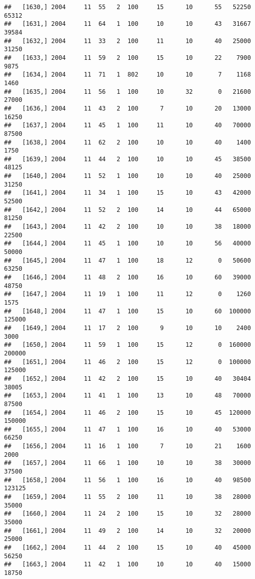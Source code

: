 \documentclass{article}\usepackage[]{graphicx}\usepackage[]{color}
\makeatletter
\newenvironment{kframe}{%
 \def\at@end@of@kframe{}%
 \ifinner\ifhmode%
  \def\at@end@of@kframe{\end{minipage}}%
  \begin{minipage}{\columnwidth}%
 \fi\fi%
 \def\FrameCommand##1{\hskip\@totalleftmargin \hskip-\fboxsep
 \colorbox{shadecolor}{##1}\hskip-\fboxsep
     \hskip-\linewidth \hskip-\@totalleftmargin \hskip\columnwidth}%
 \MakeFramed {\advance\hsize-\width
   \@totalleftmargin\z@ \linewidth\hsize
   \@setminipage}}%
 {\par\unskip\endMakeFramed%
 \at@end@of@kframe}
\newenvironment{knitrout}{}{} %
\makeatother
\begin{document}
\begin{knitrout}
\begin{kframe}
\begin{verbatim}
##   [1630,] 2004     11  55   2  100     15      10      55   52250   65312
##   [1631,] 2004     11  64   1  100     10      10      43   31667   39584
##   [1632,] 2004     11  33   2  100     11      10      40   25000   31250
##   [1633,] 2004     11  59   2  100     15      10      22    7900    9875
##   [1634,] 2004     11  71   1  802     10      10       7    1168    1460
##   [1635,] 2004     11  56   1  100     10      32       0   21600   27000
##   [1636,] 2004     11  43   2  100      7      10      20   13000   16250
##   [1637,] 2004     11  45   1  100     11      10      40   70000   87500
##   [1638,] 2004     11  62   2  100     10      10      40    1400    1750
##   [1639,] 2004     11  44   2  100     10      10      45   38500   48125
##   [1640,] 2004     11  52   1  100     10      10      40   25000   31250
##   [1641,] 2004     11  34   1  100     15      10      43   42000   52500
##   [1642,] 2004     11  52   2  100     14      10      44   65000   81250
##   [1643,] 2004     11  42   2  100     10      10      38   18000   22500
##   [1644,] 2004     11  45   1  100     10      10      56   40000   50000
##   [1645,] 2004     11  47   1  100     18      12       0   50600   63250
##   [1646,] 2004     11  48   2  100     16      10      60   39000   48750
##   [1647,] 2004     11  19   1  100     11      12       0    1260    1575
##   [1648,] 2004     11  47   1  100     15      10      60  100000  125000
##   [1649,] 2004     11  17   2  100      9      10      10    2400    3000
##   [1650,] 2004     11  59   1  100     15      12       0  160000  200000
##   [1651,] 2004     11  46   2  100     15      12       0  100000  125000
##   [1652,] 2004     11  42   2  100     15      10      40   30404   38005
##   [1653,] 2004     11  41   1  100     13      10      48   70000   87500
##   [1654,] 2004     11  46   2  100     15      10      45  120000  150000
##   [1655,] 2004     11  47   1  100     16      10      40   53000   66250
##   [1656,] 2004     11  16   1  100      7      10      21    1600    2000
##   [1657,] 2004     11  66   1  100     10      10      38   30000   37500
##   [1658,] 2004     11  56   1  100     16      10      40   98500  123125
##   [1659,] 2004     11  55   2  100     11      10      38   28000   35000
##   [1660,] 2004     11  24   2  100     15      10      32   28000   35000
##   [1661,] 2004     11  49   2  100     14      10      32   20000   25000
##   [1662,] 2004     11  44   2  100     15      10      40   45000   56250
##   [1663,] 2004     11  42   1  100     10      10      40   15000   18750

\end{verbatim}
\end{kframe}
\end{knitrout}
\end{document}
